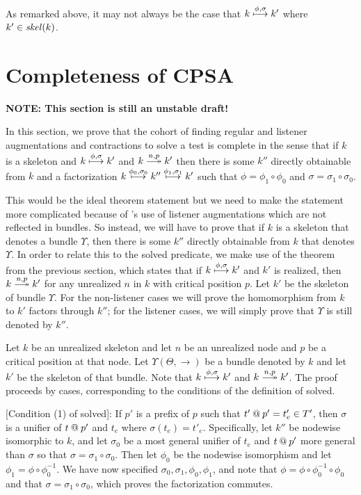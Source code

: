 \documentclass[12pt]{article}
\theoremstyle{definition}
\newcommand{\solve}[1]{\stackrel{#1}{\longtwoheadrightarrow}}
\begin{document}
As remarked above, it may not always be the case that $k \stackrel{\phi, \sigma}{\longmapsto} k'$
where $k' \in \operatorname{\mathit{skel}}(k)$.

\section{Completeness of CPSA}

{\bf NOTE: This section is still an unstable draft!}

In this section, we prove that the {\cpsa} cohort of finding regular and listener augmentations and contractions
to solve a test is complete in the sense that if $k$ is a skeleton and $k\stackrel{\phi,\sigma}{\longmapsto}k'$
and $k\solve{n,p}k'$ then there is some $k''$ directly obtainable from $k$ and a factorization
$k \stackrel{\phi_0,\sigma_0}{\longmapsto} k'' \stackrel{\phi_1,\sigma_1}{\longmapsto} k'$ such that $\phi = \phi_1 \circ \phi_0$
and $\sigma = \sigma_1 \circ \sigma_0$.

This would be the ideal theorem statement but we need to make the statement more complicated because of {\cpsa}'s
use of listener augmentations which are not reflected in bundles.  So instead, we will have to prove that if
$k$ is a skeleton that denotes a bundle $\Upsilon$, then there is some $k''$ directly obtainable from $k$ that
denotes $\Upsilon$.  In order to relate this to the solved predicate, we make use of the theorem from the
previous section, which states that if $k\stackrel{\phi,\sigma}{\longmapsto}k'$ and $k'$ is realized, then $k\solve{n,p}k'$
for any unrealized $n$ in $k$ with critical position $p$.  Let $k'$ be the skeleton of bundle $\Upsilon$.
For the non-listener cases we will prove the homomorphism from $k$ to $k'$ factors through $k''$; for the listener
cases, we will simply prove that $\Upsilon$ is still denoted by $k''$.

Let $k$ be an unrealized skeleton and let $n$ be an unrealized node and $p$ be a critical position at that node.
Let $\Upsilon(\Theta,\to)$ be a bundle denoted by $k$ and let $k'$ be the skeleton of that bundle.
Note that $k\stackrel{\phi,\sigma}{\longmapsto}k'$ and $k\solve{n,p}k'$.
The proof proceeds by cases, corresponding to the conditions of the definition of solved.

[Condition (1) of solved]: If $p'$ is a prefix of $p$ such that $t' \mathbin{@} p' = t'_e \in T'$, then
$\sigma$ is a unifier of $t \mathbin{@} p'$ and $t_e$ where $\sigma(t_e) = t'_e$.  Specifically, let $k''$ be
nodewise isomorphic to $k$, and let $\sigma_0$ be a most general unifier of $t_e$ and $t \mathbin{@} p'$
more general than $\sigma$ so that $\sigma = \sigma_1 \circ \sigma_0$.  Then let $\phi_0$ be the nodewise isomorphism
and let $\phi_1 = \phi \circ \phi_0^{-1}$.  We have now specified $\sigma_0, \sigma_1, \phi_0, \phi_1$, and note
that $\phi = \phi \circ \phi_0^{-1} \circ \phi_0$ and that $\sigma = \sigma_1 \circ \sigma_0$, which proves the
factorization commutes.
\end{document}

